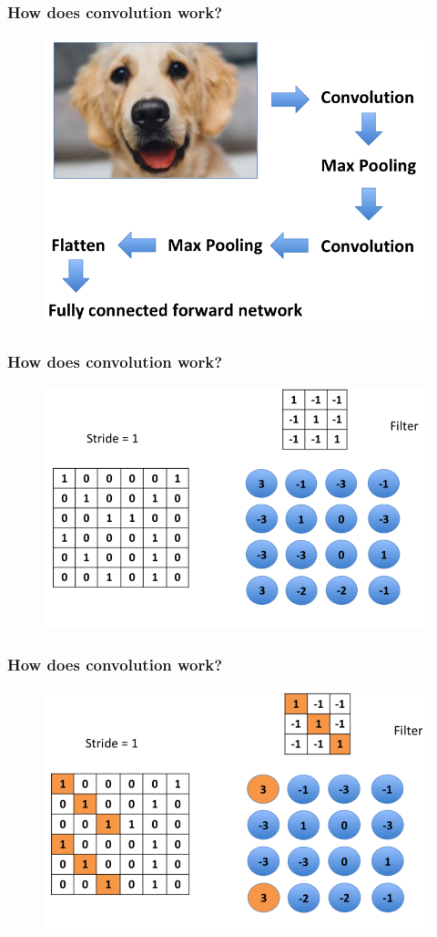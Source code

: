 \documentclass{beamer}
\begin{document}
\begin{frame}
	\frametitle{How does convolution work?}
	\begin{figure}
	\includegraphics[width=0.9\linewidth]{dog_flow}
	\end{figure}
\end{frame}

\begin{frame}
	\frametitle{How does convolution work?}
	\begin{figure}
		\includegraphics[width=0.9\linewidth]{cnn_procedure_1}
	\end{figure}
\end{frame}

\begin{frame}
	\frametitle{How does convolution work?}
	\begin{figure}
		\includegraphics[width=0.9\linewidth]{cnn_procedure_2}
	\end{figure}
\end{frame}
\end{document}
